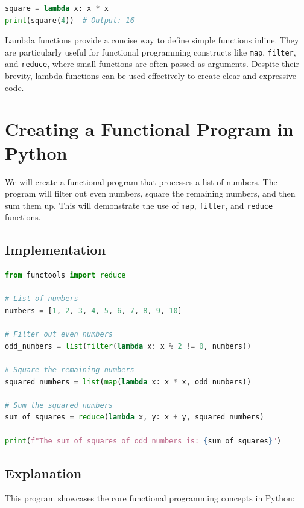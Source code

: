 \documentclass[a4paper]{article}
\begin{document}
\begin{lstlisting}[language=Python, caption=Anonymous Functions (Lambdas)]
square = lambda x: x * x
print(square(4))  # Output: 16
\end{lstlisting}

Lambda functions provide a concise way to define simple functions inline. They are particularly useful for functional programming constructs like \texttt{map}, \texttt{filter}, and \texttt{reduce}, where small functions are often passed as arguments. Despite their brevity, lambda functions can be used effectively to create clear and expressive code.\\

\section{Creating a Functional Program in Python}
We will create a functional program that processes a list of numbers. The program will filter out even numbers, square the remaining numbers, and then sum them up. This will demonstrate the use of \texttt{map}, \texttt{filter}, and \texttt{reduce} functions.\\

\subsection{Implementation}

\begin{lstlisting}[language=Python, caption=Functional Program Demo]
from functools import reduce

# List of numbers
numbers = [1, 2, 3, 4, 5, 6, 7, 8, 9, 10]

# Filter out even numbers
odd_numbers = list(filter(lambda x: x % 2 != 0, numbers))

# Square the remaining numbers
squared_numbers = list(map(lambda x: x * x, odd_numbers))

# Sum the squared numbers
sum_of_squares = reduce(lambda x, y: x + y, squared_numbers)

print(f"The sum of squares of odd numbers is: {sum_of_squares}")
\end{lstlisting}

\subsection{Explanation}
This program showcases the core functional programming concepts in Python:
\end{document}
